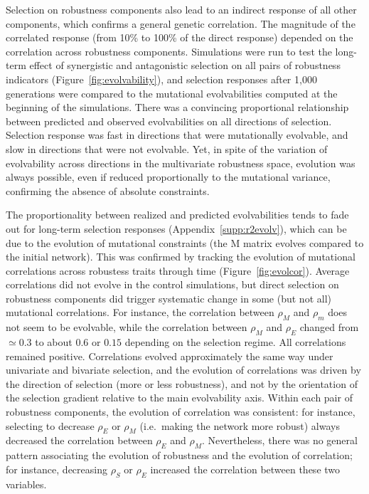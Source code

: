 \documentclass[10pt,a4paper]{article}
\newcommand{\stability}{{\rho_S}}
\newcommand{\earlyenv}{{\rho_E}}
\newcommand{\earlymut}{{\rho_M}}
\newcommand{\latemut}{{\rho_m}}
\newcommand{\M}{\bm{\mathrm M}}
\newcommand{\SupMat}{Appendix~}
\begin{document}
Selection on robustness components also lead to an indirect response of all other components, which confirms a general genetic correlation. The magnitude of the correlated response (from 10\% to 100\% of the direct response) depended on the correlation across robustness components. Simulations were run to test the long-term effect of synergistic and antagonistic selection on all pairs of robustness indicators (Figure~\ref{fig:evolvability}), and selection responses after 1,000 generations were compared to the mutational evolvabilities computed at the beginning of the simulations. There was a convincing proportional relationship between predicted and observed evolvabilities on all directions of selection. Selection response was fast in directions that were mutationally evolvable, and slow in directions that were not evolvable. Yet, in spite of the variation of evolvability across directions in the multivariate robustness space, evolution was always possible, even if reduced proportionally to the mutational variance, confirming the absence of absolute constraints. 

The proportionality between realized and predicted evolvabilities tends to fade out for long-term selection responses (\SupMat \ref{supp:r2evolv}), which can be due to the evolution of mutational constraints (the $\M$ matrix evolves compared to the initial network). This was confirmed by tracking the evolution of mutational correlations across robustess traits through time (Figure~\ref{fig:evolcor}). Average correlations did not evolve in the control simulations, but direct selection on robustness components did trigger systematic change in some (but not all) mutational correlations. For instance, the correlation between $\earlymut$ and $\latemut$ does not seem to be evolvable, while the correlation between $\earlymut$ and $\earlyenv$ changed from $\simeq 0.3$ to about $0.6$ or $0.15$ depending on the selection regime. All correlations remained positive. Correlations evolved approximately the same way under univariate and bivariate selection, and the evolution of correlations was driven by the direction of selection (more or less robustness), and not by the orientation of the selection gradient relative to the main evolvability axis. Within each pair of robustness components, the evolution of correlation was consistent: for instance, selecting to decrease $\earlyenv$ or $\earlymut$ (i.e.\ making the network more robust) always decreased the correlation between $\earlyenv$ and $\earlymut$. Nevertheless, there was no general pattern associating the evolution of robustness and the evolution of correlation; for instance, decreasing $\stability$ or $\earlyenv$ increased the correlation between these two variables. 
\end{document}
